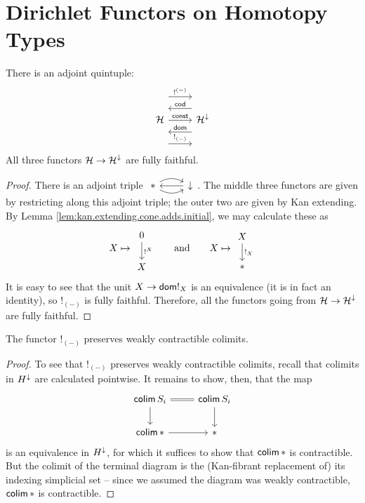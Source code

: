 \section{Dirichlet Functors on Homotopy Types} \label{sec:type.level}

\begin{prop}
  There is an adjoint quintuple:
  \[
    \begin{tikzcd}
      \Ha \arrow[r, "\const"] \arrow[r, leftarrow, shift left = 5,
      "\term{cod}"] \arrow[r, leftarrow, shift right = 5, "\term{dom}"]
      \arrow[r, shift left = 10, "!^{(-)}"]  \arrow[r, shift right = 10, "!_{(-)}"] & \Ha^{\down}
    \end{tikzcd}
  \]
  All three functors $\operatorname{\mathcal{H}} \to \operatorname{\mathcal{H}}^{\mathbin{\downarrow}}$ are fully faithful.
\end{prop}
\begin{proof}
There is an adjoint triple $\begin{tikzcd} \ast \arrow[r,leftarrow] \arrow[r,
  bend left] \arrow[r, bend right] & \down \end{tikzcd}$. The middle three
functors are given by restricting along this adjoint triple; the outer two are
given by Kan extending. By Lemma \ref{lem:kan.extending.cone.adds.initial}, we
may calculate these as
  $$X \mapsto \begin{tikzcd} 0 \arrow[d, "!^X"] \\ X \end{tikzcd}
  \qquad\text{and}\qquad
  X \mapsto \begin{tikzcd} X \arrow[d, "!_X"] \\ \ast \end{tikzcd}$$
It is easy to see that the unit $X \to \mathsf{{dom}} !_{X}$ is an equivalence (it is in
fact an identity), so $!_{(-)}$ is fully faithful. Therefore, all the functors
going from $\operatorname{\mathcal{H}} \to \operatorname{\mathcal{H}}^{\mathbin{\downarrow}}$ are fully faithful.
\end{proof}


\begin{prop}\label{lem:bang.preserves.weakly.contractible.colimits}
  The functor $!_{(-)}$ preserves weakly contractible colimits.
\end{prop}
\begin{proof}
  To see that $!_{(-)}$ preserves weakly contractible colimits, recall that colimits in $H^{\mathbin{\downarrow}}$ are calculated pointwise. It remains to show, then, that the map
  \[
    \begin{tikzcd}
    \colim S_i \arrow[r, equals] \arrow[d] & \colim S_i \arrow[d] \\
    \colim \ast \arrow[r] & \ast 
    \end{tikzcd}
  \]
  is an equivalence in $H^{\mathbin{\downarrow}}$, for which it suffices to show that $\operatorname{\mathsf{colim}} \ast$ is contractible. But the colimit of the terminal diagram is the (Kan-fibrant replacement of) its indexing simplicial set -- since we assumed the diagram was weakly contractible, $\operatorname{\mathsf{colim}} \ast$ is contractible.
\end{proof}


